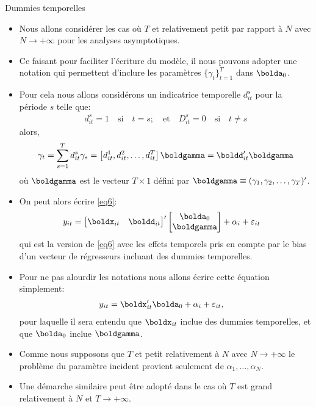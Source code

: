 \begin{frame}[allowframebreaks]{Dummies temporelles}
    \begin{itemize}
        \item Nous allons considérer les cas où $T$ et relativement petit par rapport à $N$ avec 
        $N\rightarrow +\infty$ pour les analyses asymptotiques. 
        \item Ce faisant pour faciliter l'écriture du modèle, il nous pouvons adopter 
        une notation qui permettent d'inclure les paramètres $\{\gamma_t\}_{t=1}^T$ dans $\bolda_0$.
        \item Pour cela nous allons considérons un indicatrice temporelle $d_{it}^s$ pour  la période $s$ telle que:
        \begin{align*}
        d_{it}^s = 1 \quad \textrm{si} \quad t = s; \quad \textrm{et} \quad D_{it}^s = 0 \quad \textrm{si}\quad t \neq s
        \end{align*}
        alors,
\begin{align*}
\gamma_t  = \sum_{s=1}^Td_{it}^s\gamma_s = \left[d_{it}^1, d_{it}^2, \ldots, d_{it}^T\right]\boldgamma 
= \boldd_{it}^\prime \boldgamma
\end{align*}
où $\boldgamma$ est le vecteur $T\times 1$ défini par $\boldgamma \equiv (\gamma_1, \gamma_2, \ldots, \gamma_T)^\prime$.
\item On peut alors écrire \eqref{eq6}:
\begin{align*}
    y_{it}&=\begin{bmatrix}
\boldx_{it}&\boldd_{it}
    \end{bmatrix}^\prime
    \begin{bmatrix}
        \bolda_0\\
        \boldgamma 
    \end{bmatrix}
    + \alpha_i + \varepsilon_{it}
\end{align*}
qui est la version de \eqref{eq6} avec les effets temporels pris en compte par le bias d'un 
vecteur de régresseurs incluant des dummies temporelles.  
\item Pour ne pas alourdir les notations nous allons écrire cette équation simplement: 
\begin{align}
    y_{it}&=\boldx_{it}^\prime\bolda_0 + \alpha_i + \varepsilon_{it},
    \label{eq7}
\end{align}
pour laquelle il sera entendu que $\boldx_{it}$ inclue des dummies temporelles, et 
que $\bolda_0$ inclue $\boldgamma$.
\item Comme nous supposons que $T$ et petit relativement à $N$ avec $N\rightarrow +\infty$ 
le problème du paramètre incident provient seulement de $\alpha_1, \ldots, \alpha_N$.
\item Une démarche similaire peut être adopté dans le cas où $T$ 
est grand relativement à $N$ et $T\rightarrow +\infty$.


\end{itemize}
\end{frame}

